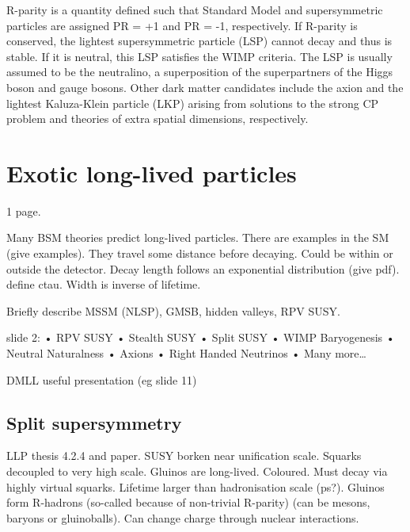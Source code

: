 R-parity is a quantity defined such that Standard Model and supersymmetric 
particles are assigned PR = +1 and PR = -1, respectively. If R-parity is 
conserved, the lightest supersymmetric particle (LSP) cannot decay and thus is 
stable. If it is neutral, this LSP satisfies the WIMP criteria. The LSP is 
usually assumed to be the neutralino, a superposition of the superpartners of 
the Higgs boson and gauge bosons. Other dark matter candidates include the 
axion and the lightest Kaluza-Klein particle (LKP) arising from solutions to 
the strong CP problem and theories of extra spatial dimensions, respectively.

\section{Exotic long-lived particles}
\begin{comment}
More details on LL theories (see LLP thesis, rob slides, my IC/SUSY slides 
etc.), R-hadron, displaced-X searches, GMSB? Note that LLPs exist in SM – call 
them BSMLLPs or LL DM/SUSY signatures? – no, exotic LLPs!
\end{comment}
1 page.

Many BSM theories predict long-lived particles. There are examples in the SM 
(give examples). They travel some distance before decaying. Could be within or 
outside the detector. Decay length follows an exponential distribution (give 
pdf). define ctau. Width is inverse of lifetime.

Briefly describe MSSM (NLSP), GMSB, hidden valleys, RPV SUSY.

slide 2: 
• RPV SUSY
• Stealth SUSY
• Split SUSY
• WIMP Baryogenesis
• Neutral Naturalness
• Axions
• Right Handed Neutrinos
• Many more…


DMLL useful presentation (eg slide 11)


\subsection{Split supersymmetry}
LLP thesis 4.2.4 and paper.
SUSY borken near unification scale. Squarks decoupled to very 
high scale. Gluinos are long-lived. Coloured. Must 
decay via highly virtual squarks. Lifetime larger than hadronisation scale 
(ps?). Gluinos form R-hadrons (so-called because of non-trivial R-parity) (can 
be mesons, baryons or gluinoballs). Can change charge through nuclear 
interactions.


